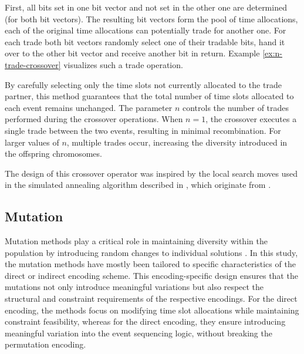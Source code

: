 \documentclass[english,examples]{isasthesis}
\begin{document}
First, all bits set in one bit vector and not set in the other one are
determined (for both bit vectors). The resulting bit vectors form the pool of
time allocations, each of the original time allocations can potentially trade
for another one. For each trade both bit vectors randomly select
one of their tradable bits, hand it over to the other bit vector and receive
another bit in return. Example \ref{ex:n-trade-crossover} visualizes such a
trade operation.

By carefully selecting only the time slots not currently allocated to the trade
partner, this method guarantees that the total number of time slots allocated
to each event remains unchanged.
The parameter $n$ controls the number of trades performed during the crossover
operations. When $n=1$, the crossover executes a single trade between the two
events, resulting in minimal recombination. For larger values of $n$, multiple
trades occur, increasing the diversity introduced in the offspring chromosomes.

The design of this crossover operator was inspired by the local search moves
used in the simulated annealing algorithm described in \cite{demiroBitvec},
which originate from \cite{Fonseca2014}.

\begin{minipage}{\textwidth}
    \begin{Example}[$n$-Trade crossover with $n=2$]
        \begin{minipage}{\textwidth}
            \centering
            
            \label{ex:n-trade-crossover}
        \end{minipage}
    \end{Example}
\end{minipage}

\subsection{Mutation}
Mutation methods play a critical role in maintaining diversity within the
population by introducing random changes to individual solutions
\cite{Katoch2021,Affenzeller2009}.
In this study, the mutation methods have mostly been tailored to specific
characteristics of the direct or indirect encoding scheme.
This encoding-specific design ensures that the mutations not only introduce
meaningful variations but also respect the structural and constraint
requirements of the respective encodings.
For the direct encoding, the methods focus on modifying time slot allocations
while maintaining constraint feasibility, whereas for the direct encoding, they
ensure introducing meaningful variation into the event sequencing logic, without
breaking the permutation encoding.
\end{document}

